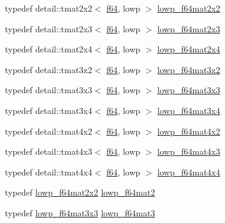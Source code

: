 \begin{CompactItemize}
\item 
typedef detail::tmat2x2$<$ \hyperlink{group__gtc__type__precision_g2bba392e555124b36cde6abba349bab3}{f64}, lowp $>$ \hyperlink{group__gtc__type__precision_g38e41c5332b4eb20b23b4ed1f06608d4}{lowp\_\-f64mat2x2}
\item 
typedef detail::tmat2x3$<$ \hyperlink{group__gtc__type__precision_g2bba392e555124b36cde6abba349bab3}{f64}, lowp $>$ \hyperlink{group__gtc__type__precision_g2add7d48faba102f53fbad2e14dfed12}{lowp\_\-f64mat2x3}
\item 
typedef detail::tmat2x4$<$ \hyperlink{group__gtc__type__precision_g2bba392e555124b36cde6abba349bab3}{f64}, lowp $>$ \hyperlink{group__gtc__type__precision_g38366c50f2a2755c49110c7fc1441683}{lowp\_\-f64mat2x4}
\item 
typedef detail::tmat3x2$<$ \hyperlink{group__gtc__type__precision_g2bba392e555124b36cde6abba349bab3}{f64}, lowp $>$ \hyperlink{group__gtc__type__precision_g99f6455a37a4c407a26981561184c76d}{lowp\_\-f64mat3x2}
\item 
typedef detail::tmat3x3$<$ \hyperlink{group__gtc__type__precision_g2bba392e555124b36cde6abba349bab3}{f64}, lowp $>$ \hyperlink{group__gtc__type__precision_g3b636bef3048da2f7935eae13e66f7b3}{lowp\_\-f64mat3x3}
\item 
typedef detail::tmat3x4$<$ \hyperlink{group__gtc__type__precision_g2bba392e555124b36cde6abba349bab3}{f64}, lowp $>$ \hyperlink{group__gtc__type__precision_g988c6645dead17a842c47ec042b5369e}{lowp\_\-f64mat3x4}
\item 
typedef detail::tmat4x2$<$ \hyperlink{group__gtc__type__precision_g2bba392e555124b36cde6abba349bab3}{f64}, lowp $>$ \hyperlink{group__gtc__type__precision_g37d10de43251a9a1be734bbb340ad2e7}{lowp\_\-f64mat4x2}
\item 
typedef detail::tmat4x3$<$ \hyperlink{group__gtc__type__precision_g2bba392e555124b36cde6abba349bab3}{f64}, lowp $>$ \hyperlink{group__gtc__type__precision_g05dba0f9d45301c7b10a9276c60b8a0e}{lowp\_\-f64mat4x3}
\item 
typedef detail::tmat4x4$<$ \hyperlink{group__gtc__type__precision_g2bba392e555124b36cde6abba349bab3}{f64}, lowp $>$ \hyperlink{group__gtc__type__precision_gb7d0922ed8d93ee3ce995858feb41231}{lowp\_\-f64mat4x4}
\item 
typedef \hyperlink{group__gtc__type__precision_g38e41c5332b4eb20b23b4ed1f06608d4}{lowp\_\-f64mat2x2} \hyperlink{group__gtc__type__precision_g2984b3b0b6ee0657044d186bb875b4e3}{lowp\_\-f64mat2}
\item 
typedef \hyperlink{group__gtc__type__precision_g3b636bef3048da2f7935eae13e66f7b3}{lowp\_\-f64mat3x3} \hyperlink{group__gtc__type__precision_g4acbda53fb7ff9568c0a2786fad450b8}{lowp\_\-f64mat3}

\end{CompactItemize}
